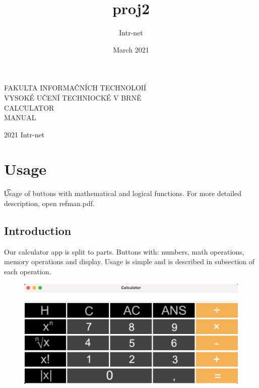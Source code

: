 \documentclass[11pt, a4paper]{article}
\title{proj2}
\author{Intr-net}
\date{March 2021}
\begin{document}
    \begin{titlepage}
        \begin{center}
            \vspace*{1cm}

            \huge
            \Huge F\huge AKULTA INFORMAČNÍCH TECHNOLOIÍ\\
            \hspace{0.2cm}
            \Huge V\huge YSOKÉ UČENÍ TECHNIOCKÉ V \Huge B\huge RNĚ\\
            CALCULATOR \\
            MANUAL


        \end{center}
        {\LARGE 2021 \hfill
        Intr-net}
    \end{titlepage}

    \newpage

    \tableofcontents


    \section{Usage}
    \t Usage of buttons with mathematical and logical functions.
    For more detailed description, open refman.pdf.
    \label{sec:usage}

    \subsection{Introduction}
    \label{subsec:Introduction}
    Our calculator app is split to parts. Buttons with: numbers, math operations, memory operations and display.
    Usage is simple and is described in subsection of each operation.
    \newline
    \begin{figure}[h]
        \includegraphics[scale = 0.5]{Calc_screen.png}
        \centering
        \label{fig:calc}
    \end{figure}
\end{document}
